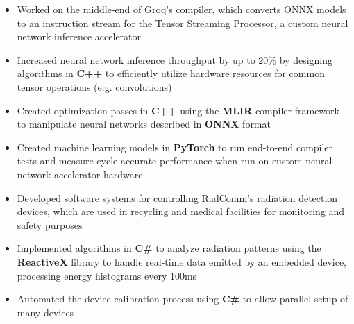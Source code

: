 \documentclass{moderncv}
\begin{document}
\begin{comment}
Snowflake1: Aggregation Policy Parser Stuff
basically, added a new type of policy which is an SQL object
it had to be added to the parser through an ANTLR grammar
but there was an issue with the way the grammar was factored into sub-grammars
so I had to inspect generated code and eventually refactor the root rules
into subrules in separate files
    rootparser.g:
        rule -> rule1 | rule2 | rule3;
    rules1.g:
        rule1 -> [...]
        rule2 -> [...]
    rules2.g:
        rule3 -> [...]
became
    rootparser.g:
        rule -> rules1 | rules2
    rules1.g:
        rules1 -> rule1 | rule2
        rule1 -> [...]
        rule2 -> [...]
    rules2.g:
        rule3 -> [...]
and then i was able to implement the rules for that type of policy
\end{comment}

{\begin{itemize}
    \item Worked on the middle-end of Groq's compiler, which converts ONNX models to an instruction stream for the Tensor Streaming Processor, a custom neural network inference accelerator
    \item Increased neural network inference throughput by up to 20\% by designing algorithms in \textbf{C++} to efficiently utilize hardware resources for common tensor operations (e.g. convolutions)
    \item Created optimization passes in \textbf{C++} using the \textbf{MLIR} compiler framework to manipulate neural networks described in \textbf{ONNX} format
    \item Created machine learning models in \textbf{PyTorch} to run end-to-end compiler tests and measure cycle-accurate performance when run on custom neural network accelerator hardware
\end{itemize}}

{\begin{itemize}
    \item Developed software systems for controlling RadComm's radiation detection devices, which are used in recycling and medical facilities for monitoring and safety purposes
    \item Implemented algorithms in \textbf{C\#} to analyze radiation patterns using the \textbf{ReactiveX} library to handle real-time data emitted by an embedded device, processing energy histograms every 100ms
    \item Automated the device calibration process using \textbf{C\#} to allow parallel setup of many devices
\end{itemize}}
\end{document}
